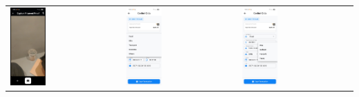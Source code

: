 \begin{tabular}{lll}
    \includegraphics[width=0.33\textwidth]{images/UI/qris-cam.jpg} &
    \includegraphics[width=0.33\textwidth]{images/UI/qris-cat.jpg} &
    \includegraphics[width=0.33\textwidth]{images/UI/qris-a.jpg}

\end{tabular}

